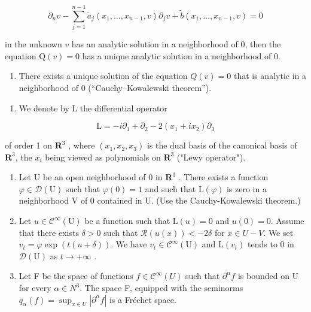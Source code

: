 \[
\partial_ {n} v - \sum_ {j = 1} ^ {n - 1} \widetilde {a} _ {j} (x _ {1}, \dots , x _ {n - 1}, v) \partial_ {j} v + \widetilde {b} (x _ {1}, \dots , x _ {n - 1}, v) = 0
\]

in the unknown \(v\) has an analytic solution in a neighborhood of 0, then the equation \(\mathrm{Q}(v) = 0\) has a unique analytic solution in a neighborhood of 0.

\begin{enumerate}
\def\labelenumi{\alph{enumi})}
\setcounter{enumi}{4}
\tightlist
\item
  There exists a unique solution of the equation \(Q(v) = 0\) that is analytic in a neighborhood of 0 (“Cauchy–Kowalewski theorem”).
\end{enumerate}

\begin{enumerate}
\def\labelenumi{\arabic{enumi})}
\setcounter{enumi}{30}
\tightlist
\item
  We denote by L the differential operator
\end{enumerate}

\[
\mathrm{L} = - i \partial_ {1} + \partial_ {2} - 2 (x _ {1} + i x _ {2}) \partial_ {3}
\]

of order 1 on \(\mathbf{R}^{3}\) , where \((x_{1}, x_{2}, x_{3})\) is the dual basis of the canonical basis of \(\mathbf{R}^{3}\), the \(x_{i}\) being viewed as polynomials on \(\mathbf{R}^{3}\) ("Lewy operator").

\begin{enumerate}
\def\labelenumi{\alph{enumi})}
\item
  Let U be an open neighborhood of 0 in \(\mathbf{R}^3\) . There exists a function \(\varphi \in \mathcal{D}(\mathrm{U})\) such that \(\varphi(0) = 1\) and such that \(\mathrm{L}(\varphi)\) is zero in a neighborhood V of 0 contained in U. (Use the Cauchy-Kowalewski theorem.)
\item
  Let \(u \in \mathcal{C}^{\infty}(\mathrm{U})\) be a function such that \(\mathrm{L}(u) = 0\) and \(u(0) = 0\). Assume that there exists \(\delta > 0\) such that \(\mathcal{R}(u(x)) < -2\delta\) for \(x \in U - V\). We set \(v_{t} = \varphi \exp(t(u + \delta))\). We have \(v_{t} \in \mathcal{C}^{\infty}(\mathrm{U})\) and \(\mathrm{L}(v_{t})\) tends to 0 in \(\mathcal{D}(\mathrm{U})\) as \(t \to +\infty\) .
\item
  Let F be the space of functions \(f \in \mathcal{C}^{\infty}(U)\) such that \(\partial^{\alpha}f\) is bounded on U for every \(\alpha \in N^{3}\). The space F, equipped with the seminorms \(q_{\alpha}(f) = \sup_{x \in U} |\partial^{\alpha}f|\) is a Fréchet space.
\end{enumerate}

